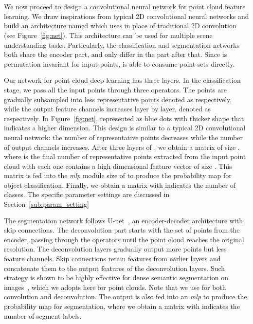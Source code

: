 \documentclass[10pt,twocolumn,letterpaper]{article}
\begin{document}
\section{\ournet}
\label{sec:net}

We now proceed to design a convolutional neural network for point cloud feature learning. We draw inspirations from typical 2D convolutional neural networks and build an architecture named \ournet which uses \ourconv in place of traditional 2D convolution (see Figure~\ref{fig:net}).
This architecture can be used for multiple scene understanding tasks. Particularly, the classification and segmentation networks both share the encoder part, and only differ in the part after that. Since \ourconv is permutation invariant for input points, \ournet is able to consume point sets directly.

Our network for point cloud deep learning has three layers. In the classification stage, we pass all the input points through three \ourconv operators. The points are gradually subsampled into less representative points denoted as  respectively, while the output feature channels increases layer by layer, denoted as  respectively. In Figure~\ref{fig:net},  represented as blue dots with thicker shape that indicates a higher dimension. This design is similar to a typical 2D convolutional neural network: the number of representative points decreases while the number of output channels increases. After three layers of \ourconv, we obtain a matrix of size , where  is the final number of representative points extracted from the input point cloud with each one contains a high dimensional feature vector of size . This matrix is fed into the \textit{mlp} module size of  to produce the probability map for object classification. Finally, we obtain a  matrix with  indicates the number of classes. The specific parameter settings are discussed in Section~\ref{sub:param_setting}

The segmentation network follows U-net~\cite{ron2015unet}, an encoder-decoder architecture with skip connections. The deconvolution part starts with the set of  points from the encoder, passing through the \ourconv operators until the point cloud reaches the original resolution. 
The deconvolution layers gradually output more points but less feature channels. Skip connections retain  features from
earlier layers and concatenate them to the output features of the deconvolution layers. Such strategy is shown to be highly effective for dense semantic segmentation on images~\cite{ron2015unet}, which we adopts here for point clouds. 
Note that we use \ourconv for both convolution and deconvolution. 
The output  is also fed into an \textit{mlp} to produce the probability map for segmentation, where we obtain a  matrix with  indicates the number of segment labels.
\end{document}
